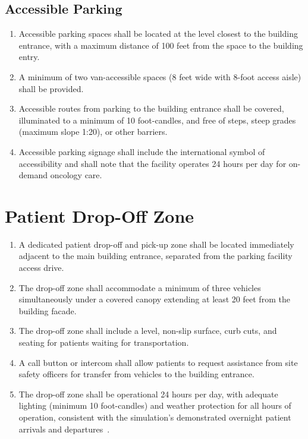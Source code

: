 \documentclass[11pt,letterpaper]{article}
\begin{document}
\subsection{Accessible Parking}

\begin{enumerate}[label=(\alph*)]
\item Accessible parking spaces shall be located at the level closest to the
  building entrance, with a maximum distance of 100 feet from the space to
  the building entry.

\item A minimum of two van-accessible spaces (8 feet wide with 8-foot access
  aisle) shall be provided.

\item Accessible routes from parking to the building entrance shall be covered,
  illuminated to a minimum of 10 foot-candles, and free of steps, steep grades
  (maximum slope 1:20), or other barriers.

\item Accessible parking signage shall include the international symbol of
  accessibility and shall note that the facility operates 24 hours per day
  for on-demand oncology care.
\end{enumerate}

\section{Patient Drop-Off Zone}

\begin{enumerate}[label=(\alph*)]
\item A dedicated patient drop-off and pick-up zone shall be located immediately
  adjacent to the main building entrance, separated from the parking facility
  access drive.

\item The drop-off zone shall accommodate a minimum of three vehicles
  simultaneously under a covered canopy extending at least 20 feet from the
  building facade.

\item The drop-off zone shall include a level, non-slip surface, curb cuts,
  and seating for patients waiting for transportation.

\item A call button or intercom shall allow patients to request assistance
  from site safety officers for transfer from vehicles to the building
  entrance.

\item The drop-off zone shall be operational 24 hours per day, with adequate
  lighting (minimum 10 foot-candles) and weather protection for all hours of
  operation, consistent with the simulation's demonstrated overnight patient
  arrivals and departures~\cite{newtrial2026}.
\end{enumerate}
\end{document}
